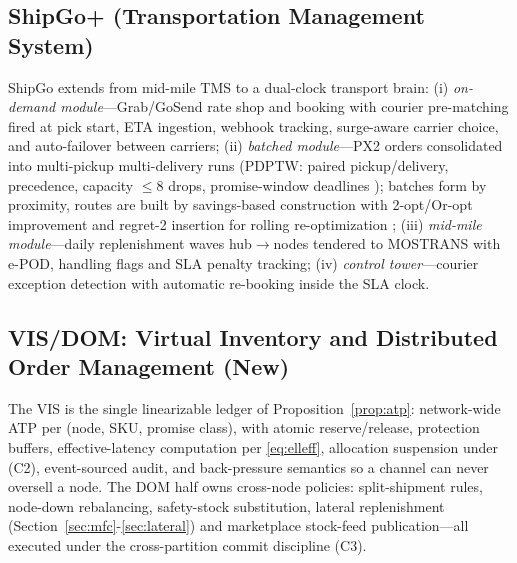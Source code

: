 \subsection{ShipGo+ (Transportation Management System)}
ShipGo extends from mid-mile TMS to a dual-clock transport brain: (i) \emph{on-demand module}---Grab/GoSend rate shop and booking with courier pre-matching fired at pick start, ETA ingestion, webhook tracking, surge-aware carrier choice, and auto-failover between carriers; (ii) \emph{batched module}---PX2 orders consolidated into multi-pickup multi-delivery runs (PDPTW: paired pickup/delivery, precedence, capacity $\le8$ drops, promise-window deadlines \cite{ropke2006}); batches form by proximity, routes are built by savings-based construction \cite{clarke1964} with 2-opt/Or-opt improvement and regret-2 insertion for rolling re-optimization \cite{klapp2018,ropke2006}; (iii) \emph{mid-mile module}---daily replenishment waves hub$\to$nodes tendered to MOSTRANS with e-POD, handling flags and SLA penalty tracking; (iv) \emph{control tower}---courier exception detection with automatic re-booking inside the SLA clock.

\subsection{VIS/DOM: Virtual Inventory and Distributed Order Management (New)}
The VIS is the single linearizable ledger of Proposition~\ref{prop:atp}: network-wide ATP per (node, SKU, promise class), with atomic reserve/release, protection buffers, effective-latency computation per \eqref{eq:elleff}, allocation suspension under (C2), event-sourced audit, and back-pressure semantics so a channel can never oversell a node. The DOM half owns cross-node policies: split-shipment rules, node-down rebalancing, safety-stock substitution, lateral replenishment (Section~\ref{sec:mfc}-\ref{sec:lateral}) and marketplace stock-feed publication---all executed under the cross-partition commit discipline (C3).


